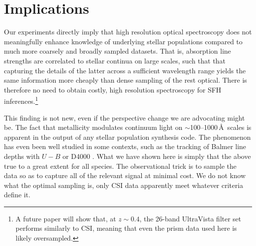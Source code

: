 \documentclass[a4paper,fleqn,usenatbib]{mnras}
\newcommand{\benum}{\begin{enumerate}}
\newcommand{\eenum}{\end{enumerate}}
\begin{document}

\section{Implications}
\label{sec:discussion}




Our experiments directly imply that high resolution optical spectroscopy does not meaningfully 
enhance knowledge of underlying stellar populations compared to much more coarsely and broadly 
sampled datasets. That is, absorption line strengths are correlated to stellar continua on large scales, 
such that that capturing the details of the latter across a sufficient wavelength range yields the same 
information more cheaply than dense sampling of the rest optical. There is therefore no need to obtain 
costly, high resolution spectroscopy for SFH inferences.\footnote{A future 
paper will show that, at $z\sim0.4$, the 26-band UltraVista filter set \citep{Muzzin13} performs 
similarly to CSI, meaning that even the prism data used here is likely oversampled.}

This finding is not new, even if the perspective change we are advocating might be. The fact that 
metallicity modulates continuum light on $\sim$100--1000\,\AA\ scales is apparent in the
output of any stellar population synthesis code. The phenomenon has even been well studied in 
some contexts, such as the tracking of Balmer line depths with $U-B$ or D4000 
\citep[e.g.,][]{Kauffmann03}. What we have shown here is simply that the above true to a great 
extent for all species. The observational trick is to sample the data so as to capture all
of the relevant signal at minimal cost. We do not know what the optimal sampling is, only CSI 
data apparently meet whatever criteria define it.
\end{document}
